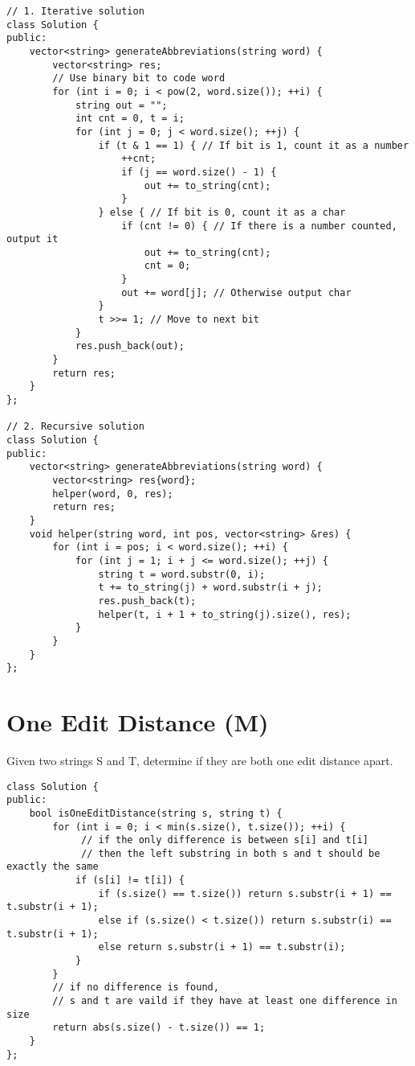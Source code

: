 \begin{lstlisting}
// 1. Iterative solution
class Solution {
public:
    vector<string> generateAbbreviations(string word) {
        vector<string> res;
        // Use binary bit to code word
        for (int i = 0; i < pow(2, word.size()); ++i) {
            string out = "";
            int cnt = 0, t = i;
            for (int j = 0; j < word.size(); ++j) {
                if (t & 1 == 1) { // If bit is 1, count it as a number
                    ++cnt;
                    if (j == word.size() - 1) {
                        out += to_string(cnt);
                    }
                } else { // If bit is 0, count it as a char
                    if (cnt != 0) { // If there is a number counted, output it
                        out += to_string(cnt);
                        cnt = 0;
                    }
                    out += word[j]; // Otherwise output char
                }
                t >>= 1; // Move to next bit
            }
            res.push_back(out);
        }
        return res;
    }
};

// 2. Recursive solution
class Solution {
public:
    vector<string> generateAbbreviations(string word) {
        vector<string> res{word};
        helper(word, 0, res);
        return res;
    }
    void helper(string word, int pos, vector<string> &res) {
        for (int i = pos; i < word.size(); ++i) {
            for (int j = 1; i + j <= word.size(); ++j) {
                string t = word.substr(0, i);
                t += to_string(j) + word.substr(i + j);
                res.push_back(t);
                helper(t, i + 1 + to_string(j).size(), res);
            }
        }
    }
};
\end{lstlisting}


\section{One Edit Distance (M)}
Given two strings S and T, determine if they are both one edit distance apart.\\

\begin{lstlisting}
class Solution {
public:
    bool isOneEditDistance(string s, string t) {
        for (int i = 0; i < min(s.size(), t.size()); ++i) {
             // if the only difference is between s[i] and t[i]
             // then the left substring in both s and t should be exactly the same
            if (s[i] != t[i]) {
                if (s.size() == t.size()) return s.substr(i + 1) == t.substr(i + 1);
                else if (s.size() < t.size()) return s.substr(i) == t.substr(i + 1);
                else return s.substr(i + 1) == t.substr(i);
            }
        }
        // if no difference is found, 
        // s and t are vaild if they have at least one difference in size
        return abs(s.size() - t.size()) == 1;
    }
};
\end{lstlisting}


